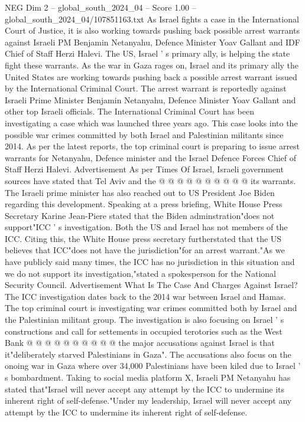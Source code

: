 \begin{textsample}{NEG Dim 2 – global\_south\_2024\_04 – Score 1.00 – global\_south\_2024\_04/107851163.txt}  \label{ex:f2_neg_291}
As Israel fights a case in the International Court of Justice, it is also working towards pushing back possible arrest warrants against Israeli PM Benjamin Netanyahu, Defence Minister Yoav Gallant and IDF Chief of Staff Herzi Halevi.
The US, Israel ' s primary ally, is helping the state fight these warrants.
As the war in Gaza rages on, Israel and its primary ally the United States are working towards pushing back a possible arrest warrant issued by the International Criminal Court.
The arrest warrant is reportedly against Israeli Prime Minister Benjamin Netanyahu, Defence Minister Yoav Gallant and other top Israeli officials.
The International Criminal Court has been investigating a case which was launched three years ago.
This case looks into the possible war crimes committed by both Israel and Palestinian militants since 2014.
As per the latest reports, the top criminal court is preparing to issue arrest warrants for Netanyahu, Defence minister and the Israel Defence Forces Chief of Staff Herzi Halevi.
Advertisement As per Times Of Israel, Israeli government sources have stated that Tel Aviv and the @ @ @ @ @ @ @ @ @ @ its warrants.
The Israeli prime minister has also reached out to US President Joe Biden regarding this development.
Speaking at a press briefing, White House Press Secretary Karine Jean-Piere stated that the Biden adminstration"does not support"ICC ' s investigation.
Both the US and Israel has not members of the ICC.
Citing this, the White House press secretary furtherstated that the US believes that ICC"does not have the jurisdiction"for an arrest warrant."As we have publicly said many times, the ICC has no jurisdiction in this situation and we do not support its investigation,"stated a spokesperson for the National Security Council.
Advertisement What Is The Case And Charges Against Israel?
The ICC investigation dates back to the 2014 war between Israel and Hamas.
The top criminal court is investigating war crimes committed both by Israel and the Palestinian militant group.
The investigation is also focusing on Israel ' s constructions and call for settements in occupied terotories such as the West Bank @ @ @ @ @ @ @ @ @ @ the major accusations against Israel is that it"deliberately starved Palestinians in Gaza".
The accusations also focus on the onoing war in Gaza where over 34,000 Palestinians have been kiled due to Israel ' s bombardment.
Taking to social media platform X, Israeli PM Netanyahu has stated that"Israel will never accept any attempt by the ICC to undermine its inherent right of self-defense."Under my leadership, Israel will never accept any attempt by the ICC to undermine its inherent right of self-defense.

\end{textsample}
